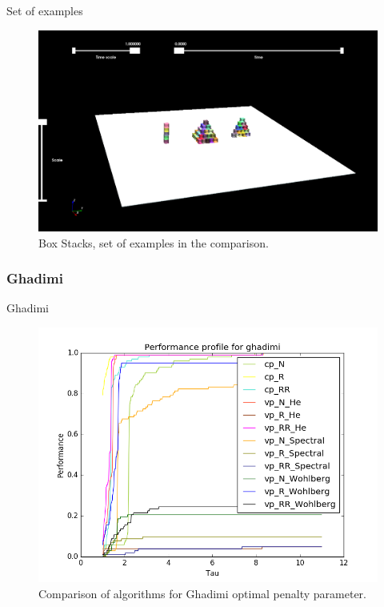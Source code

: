 \documentclass[8pt,red]{beamer}
\theoremstyle{plain}
\theoremstyle{definition}
\theoremstyle{remark}
\begin{document}
\begin{frame}{Set of examples}
\begin{figure}[hbtp]
\centering
\includegraphics[scale=0.2]{Results/Example/cubes.png}
\caption{Box Stacks, set of examples in the comparison.}
\end{figure}
\end{frame}


\subsubsection{Ghadimi}
\begin{frame}{Ghadimi}
\begin{figure}[hbtp]
\centering
\includegraphics[scale=0.4]{Results/Ghadimi_mini.png}
\caption{Comparison of algorithms for Ghadimi optimal penalty parameter.}
\end{figure}
\end{frame}
\end{document}
